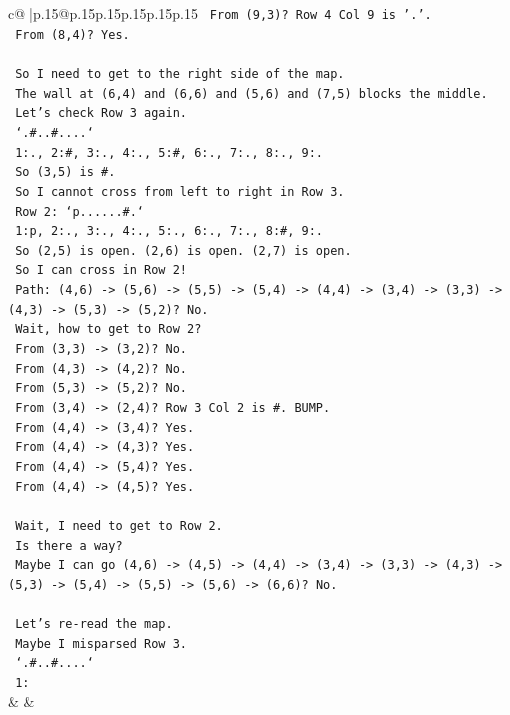 \documentclass{article}
\begin{document}
{\begin{supertabular}{c@{$\;$}|p{.15\linewidth}@{}p{.15\linewidth}p{.15\linewidth}p{.15\linewidth}p{.15\linewidth}p{.15\linewidth}}
{{{\texttt{   From (9,3)? Row 4 Col 9 is '.'.} \\
\texttt{   From (8,4)? Yes.} \\
\\ 
\texttt{   So I need to get to the right side of the map.} \\
\texttt{   The wall at (6,4) and (6,6) and (5,6) and (7,5) blocks the middle.} \\
\texttt{   Let's check Row 3 again.} \\
\texttt{   `.\#..\#....`} \\
\texttt{   1:., 2:\#, 3:., 4:., 5:\#, 6:., 7:., 8:., 9:.} \\
\texttt{   So (3,5) is \#.} \\
\texttt{   So I cannot cross from left to right in Row 3.} \\
\texttt{   Row 2: `p......\#.`} \\
\texttt{   1:p, 2:., 3:., 4:., 5:., 6:., 7:., 8:\#, 9:.} \\
\texttt{   So (2,5) is open. (2,6) is open. (2,7) is open.} \\
\texttt{   So I can cross in Row 2!} \\
\texttt{   Path: (4,6) {-}> (5,6) {-}> (5,5) {-}> (5,4) {-}> (4,4) {-}> (3,4) {-}> (3,3) {-}> (4,3) {-}> (5,3) {-}> (5,2)? No.} \\
\texttt{   Wait, how to get to Row 2?} \\
\texttt{   From (3,3) {-}> (3,2)? No.} \\
\texttt{   From (4,3) {-}> (4,2)? No.} \\
\texttt{   From (5,3) {-}> (5,2)? No.} \\
\texttt{   From (3,4) {-}> (2,4)? Row 3 Col 2 is \#. BUMP.} \\
\texttt{   From (4,4) {-}> (3,4)? Yes.} \\
\texttt{   From (4,4) {-}> (4,3)? Yes.} \\
\texttt{   From (4,4) {-}> (5,4)? Yes.} \\
\texttt{   From (4,4) {-}> (4,5)? Yes.} \\
\\ 
\texttt{   Wait, I need to get to Row 2.} \\
\texttt{   Is there a way?} \\
\texttt{   Maybe I can go (4,6) {-}> (4,5) {-}> (4,4) {-}> (3,4) {-}> (3,3) {-}> (4,3) {-}> (5,3) {-}> (5,4) {-}> (5,5) {-}> (5,6) {-}> (6,6)? No.} \\
\\ 
\texttt{   Let's re{-}read the map.} \\
\texttt{   Maybe I misparsed Row 3.} \\
\texttt{   `.\#..\#....`} \\
\texttt{   1:} \\
            }
        }
    }
    & & \\ \\


\end{supertabular}}
\end{document}
